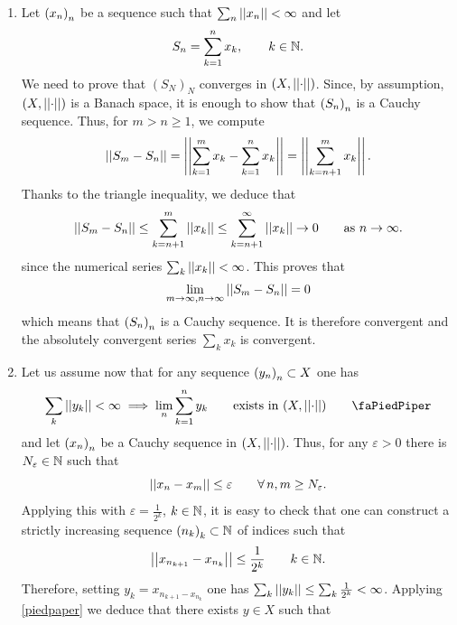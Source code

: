 \documentclass{article}
\begin{document}
\begin{fancyproof}
	\begin{enumerate}
		\item[$(1\Rightarrow 2)$] Let ${\left({x}_{n}\right)}_{n}$ be a sequence such that $\sum_{n}\left|\left|x_{n}\right|\right|<\infty$ and let 
		\begin{equation*}
			S_{n}=\sum_{k=1}^{n}x_{k},\qquad k\in\mathbb{N}.
		\end{equation*}
		We need to prove that ${(S_{N})}_{N}$ converges in $\left(X,\left|\left|\cdot\right|\right|\right)$. Since, by assumption, $(X,\left|\left|\cdot\right|\right|)$ is a Banach space, it is enough to show that ${\left({S}_{n}\right)}_{n}$ is a Cauchy sequence. Thus, for $m>n\geq 1$, we compute
		\begin{equation*}
			\left|\left|S_{m}-S_{n}\right|\right|=\left|\left|\sum_{k=1}^{m}x_{k}-\sum_{k=1}^{n}x_{k}\right|\right|=\left|\left|\sum_{k=n+1}^{m}x_{k}\right|\right|.
		\end{equation*}
		Thanks to the triangle inequality, we deduce that
		\begin{equation*}
			\left|\left|S_{m}-S_{n}\right|\right|\leq\sum_{k=n+1}^{m}\left|\left|x_{k}\right|\right|\leq\sum_{k=n+1}^{\infty}\left|\left|x_{k}\right|\right|\to0\qquad\text{as }n\to\infty.
		\end{equation*}
		since the numerical series $\sum_k\left|\left|x_{k}\right|\right|<\infty$. This proves that
		\begin{equation*}
			\lim_{m\to\infty,n\to\infty}\left|\left|S_{m}-S_{n}\right|\right|=0
		\end{equation*}
		which means that ${\left({S}_{n}\right)}_{n}$ is a Cauchy sequence. It is therefore convergent and the absolutely convergent series $\sum_k x_k$ is convergent.
		\item[$(2\Rightarrow1)$] Let us assume now that for any sequence ${\left({y}_{n}\right)}_{n}\subset X$ one has
		\begin{equation*}
			\sum_k\norm{y_k}<\infty\implies\lim_n\sum_{k=1}^{n}y_k\qquad\text{exists in }(X,\dnorm)\tag*{\faPiedPiper}\label{piedpaper}
		\end{equation*}
		and let ${\left({x}_{n}\right)}_{n}$ be a Cauchy sequence in $\left(X,\left|\left|\cdot\right|\right|\right)$. Thus, for any $\varepsilon>0$ there is $N_\varepsilon\in\mathbb{N}$ such that
		\begin{equation*}
			\left|\left|x_n-x_m\right|\right|\leq\varepsilon\qquad\forall\, n,m\geq N_\varepsilon.
		\end{equation*}
		Applying this with $\varepsilon=\frac{1}{2^{k}}$, $k\in\mathbb{N}$, it is easy to check that one can construct a strictly increasing sequence ${\left({n}_{k}\right)}_{k}\subset\mathbb{N}$ of indices such that
		\begin{equation*}
			\left|\left|x_{n_{k+1}}-x_{n_{k}}\right|\right|\leq\frac{1}{2^{k}}\qquad k\in\mathbb{N}.
		\end{equation*}
		Therefore, setting $y_k=x_{n_{k+1}-x_{n_{k}}}$ one has $\sum_k\left|\left|y_k\right|\right|\leq\sum_k\frac{1}{2^{k}}<\infty$. Applying \ref{piedpaper} we deduce that there exists $y\in X$ such that

\end{enumerate}
\end{fancyproof}
\end{document}
